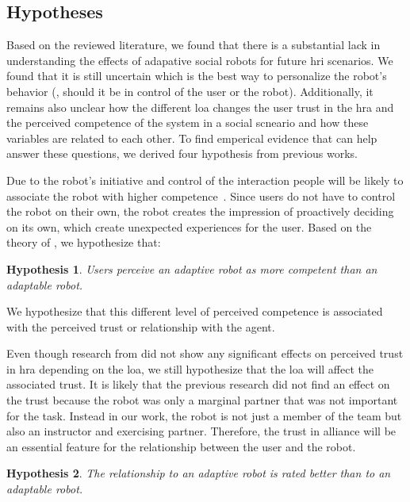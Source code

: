\documentclass[twocolumn]{svjour3}          %
\newtheorem{hypo}{Hypothesis}
\begin{document}
\hypertarget{hypotheses}{%
\subsection{Hypotheses}\label{hypotheses}}

Based on the reviewed literature, we found that there is a substantial lack in understanding the effects of adapative social robots for future \gls{hri} scenarios. We found that it is still uncertain which is the best way to personalize the robot's behavior (\ie{}, should it be in control of the user or the robot). Additionally, it remains also unclear how the different \gls{loa} changes the user trust in the \gls{hra} and the perceived competence of the system in a social scneario and how these variables are related to each other. To find emperical evidence that can help answer these questions, we derived four hypothesis from previous works.

Due to the robot's initiative and control of the interaction people will
be likely to associate the robot with higher competence~\cite{hancock2011meta}. Since users do
not have to control the robot on their own, the robot creates the impression of proactively deciding on its own, which create unexpected experiences for the user. Based on the theory of \textcite{epley2007seeing}, we hypothesize that:

\begin{hypo}\label{hyp:adaptability:competence}
 Users perceive an \textit{adaptive} robot as more competent than an \textit{adaptable} robot.
\end{hypo}

 We hypothesize that this different level of perceived competence is associated with the perceived
trust or relationship with the agent.

Even though research from \textcite{rau2013effects} did not show any
significant effects on perceived trust in \gls{hra} depending on the \gls{loa}, we still
hypothesize that the \gls{loa} will affect the associated
trust. It is likely that the previous research did not find an
effect on the trust because the robot was only a marginal partner that
was not important for the task. Instead in our work, the robot is not
just a member of the team but also an instructor and exercising partner. Therefore, the trust in alliance will be an essential
feature for the relationship between the user and the robot.

\begin{hypo}\label{hyp:adaptability:trust}
 The relationship to an \textit{adaptive} robot is rated better than to an \textit{adaptable} robot.
\end{hypo}
\end{document}
